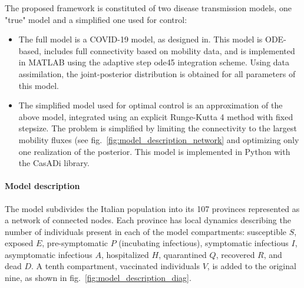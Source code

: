 The proposed framework is constituted of two disease transmission models, one "true" model and a simplified one used for control:
\begin{itemize}
    \item The full model is a COVID-19 model, as designed in\cite{Gatto:SpreadDynamicsCOVID19:2020, Bertuzzo:GeographyCOVID19Spread:2020}. This model is ODE-based, includes full connectivity based on mobility data, and is implemented in MATLAB using the adaptive step ode45 integration scheme. Using data assimilation, the joint-posterior distribution is obtained for all parameters of this model. 
    \item The simplified model used for optimal control is an approximation of the above model, integrated using an explicit Runge-Kutta 4 method with fixed stepsize. The problem is simplified by limiting the connectivity to the largest mobility fluxes (see fig.~\ref{fig:model_description_network} and optimizing only one realization of the posterior. This model is implemented in Python with the CasADi library.
\end{itemize}

\paragraph{Model description}
The model subdivides the Italian population into its 107 provinces represented as a network of connected nodes. Each province has local dynamics describing the number of individuals present in each of the model compartments: susceptible $S$, exposed $E$, pre-symptomatic $P$ (incubating infectious), symptomatic infectious $I$, asymptomatic infectious $A$, hospitalized $H$, quarantined $Q$, recovered $R$, and dead $D$. A tenth compartment, vaccinated individuals $V$, is added to the original nine, as shown in fig.~\ref{fig:model_description_diag}.

